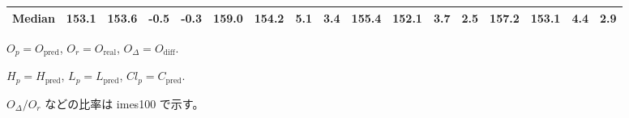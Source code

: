 \begin{threeparttable}
{\begin{tabular}{lrrrrrrrrrrrrrrrr}
 Median & 153.1 & 153.6 &       -0.5 &           -0.3 & 159.0 & 154.2 &        5.1 &            3.4 & 155.4 & 152.1 &        3.7 &            2.5 &  157.2 &  153.1 &         4.4 &              2.9 \\
\bottomrule
\end{tabular}
}
\begin{tablenotes}\footnotesize
\item $O_p=O_{\text{pred}}$, $O_r=O_{\text{real}}$, $O_\Delta=O_{\text{diff}}$.
\item $H_p=H_{\text{pred}}$, $L_p=L_{\text{pred}}$, $Cl_p=C_{\text{pred}}$.
\item $O_\Delta/O_r$ などの比率は 	imes100 で示す。
\end{tablenotes}
\end{threeparttable}
\endgroup
